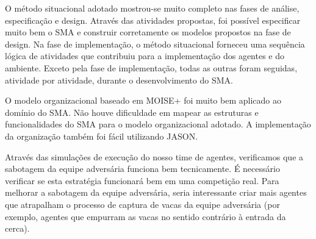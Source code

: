 \documentclass{llncs}
\begin{document}

O método situacional adotado mostrou-se muito completo nas fases de análise, especificação e design. Através das atividades propostas, foi possível especificar muito bem o SMA e construir corretamente os modelos propostos na fase de design. Na fase de implementação, o método situacional forneceu uma sequência lógica de atividades que contribuiu para a implementação dos agentes e do ambiente. Exceto pela fase de implementação, todas as outras foram seguidas, atividade por atividade, durante o desenvolvimento do SMA.

O modelo organizacional baseado em MOISE+ foi muito bem aplicado ao domínio do SMA. Não houve dificuldade em mapear as estruturas e funcionalidades do SMA para o modelo organizacional adotado. A implementação da organização também foi fácil utilizando JASON.



Através das simulações de execução do nosso time de agentes, verificamos que a sabotagem da equipe adversária funciona bem tecnicamente. É necessário verificar se esta estratégia funcionará bem em uma competição real. Para melhorar a sabotagem da equipe adversária, seria interessante criar mais agentes que atrapalham o processo de captura de vacas da equipe adversária (por exemplo, agentes que empurram as vacas no sentido contrário à entrada da cerca).
\end{document}
